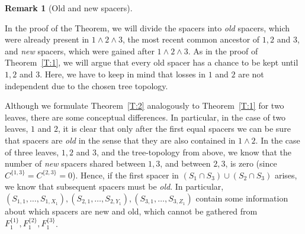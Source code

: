 \documentclass[preprint,authoryear]{elsarticle}
\theoremstyle{definition}
\newtheorem{remark}[proposition]{Remark}
\numberwithin{equation}{section}
\numberwithin{figure}{section}
\begin{document}
\begin{remark}[Old and new spacers]
  \begin{asparaenum}
  \item In the proof of the Theorem, we will divide the spacers into
    {\em old} spacers, which were already present in
    $\mathfrak 1\wedge \mathfrak 2 \wedge \mathfrak 3$, the most
    recent common ancestor of $\mathfrak 1, \mathfrak 2$ and
    $\mathfrak 3$, and {\em new} spacers, which were gained after
    $\mathfrak 1\wedge \mathfrak 2 \wedge \mathfrak 3$.  As in the
    proof of Theorem~\ref{T:1}, we will argue that every old spacer
    has a chance to be kept until $\mathfrak 1, \mathfrak 2$ and
    $\mathfrak 3$. Here, we have to keep in mind that losses in
    $\mathfrak 1$ and $\mathfrak 2$ are not independent due to the
    chosen tree topology.
  \item Although we formulate Theorem~\ref{T:2} analogously to
    Theorem~\ref{T:1} for two leaves, there are some conceptual
    differences. In particular, in the case of two leaves,
    $\mathfrak 1$ and $\mathfrak 2$, it is clear that only after the
    first equal spacers we can be sure that spacers are {\em old} in
    the sense that they are also contained in
    $\mathfrak 1\wedge\mathfrak 2$. In the case of three leaves,
    $\mathfrak 1, \mathfrak 2$ and $\mathfrak 3$, and the
    tree-topology from above, we know that the number of {\em new}
    spacers shared between $\mathfrak 1, \mathfrak 3$, and between
    $\mathfrak 2, \mathfrak 3$, is zero (since
    $C^{\{\mathfrak 1, \mathfrak 3\}} =C^{\{\mathfrak 2, \mathfrak
      3\}} = 0$).
    Hence, if the first spacer in
    $(S_{\mathfrak 1}\cap S_{\mathfrak 3})\cup (S_{\mathfrak 2}\cap
    S_{\mathfrak 3})$
    arises, we know that subsequent spacers must be {\em old}. In
    particular,
    $(S_{\mathfrak 1,1},\dots,S_{\mathfrak 1, X_1}), (S_{\mathfrak
      2,1},\dots,S_{\mathfrak 2, Y_1}), (S_{\mathfrak
      3,1},\dots,S_{\mathfrak 3, Z_1})$
    contain some information about which spacers are new and old,
    which cannot be gathered from
    $F^{\{\mathfrak 1\}}_1, F^{\{\mathfrak 2\}}_1, F^{\{\mathfrak
      3\}}_1$.
  \end{asparaenum}
\end{remark}
\end{document}
